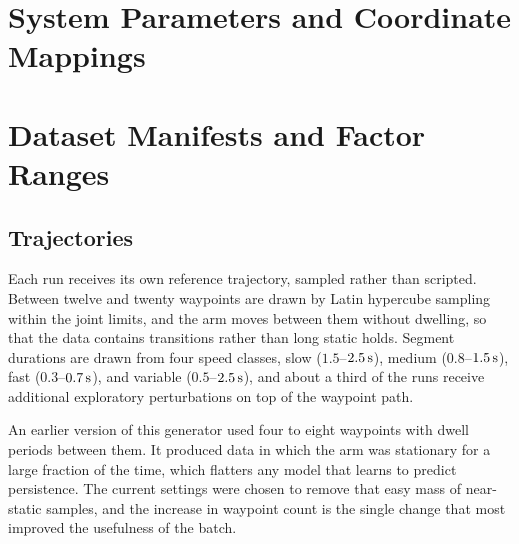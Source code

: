 
\chapter{System Parameters and Coordinate Mappings}
\label{app:system-parameters}

\chapter{Dataset Manifests and Factor Ranges}
\label{app:dataset}
\section{Trajectories}

Each run receives its own reference trajectory, sampled rather than
scripted. Between twelve and twenty waypoints are drawn by Latin
hypercube sampling within the joint limits, and the arm moves between
them without dwelling, so that the data contains transitions rather than
long static holds. Segment durations are drawn from four speed classes,
slow ($1.5$--$\unit[2.5]{s}$), medium ($0.8$--$\unit[1.5]{s}$), fast
($0.3$--$\unit[0.7]{s}$), and variable ($0.5$--$\unit[2.5]{s}$), and
about a third of the runs receive additional exploratory perturbations
on top of the waypoint path.

An earlier version of this generator used four to eight waypoints with
dwell periods between them. It produced data in which the arm was
stationary for a large fraction of the time, which flatters any model
that learns to predict persistence. The current settings were chosen to
remove that easy mass of near-static samples, and the increase in
waypoint count is the single change that most improved the usefulness of
the batch.




